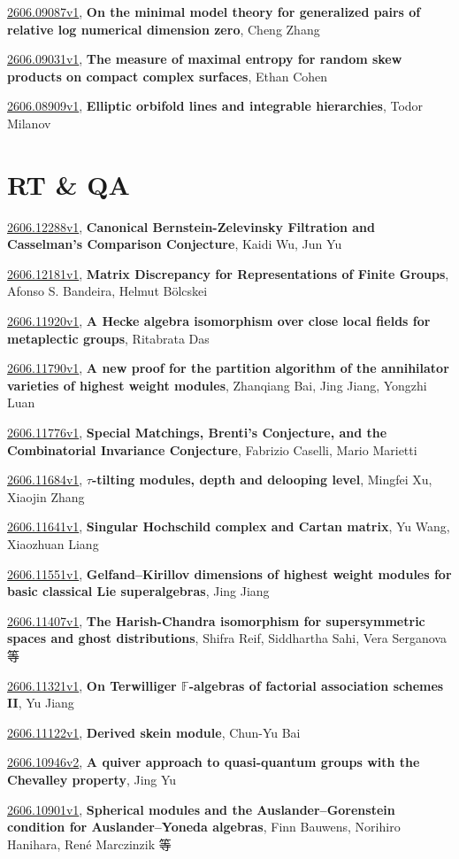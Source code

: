 \documentclass[9pt, a4paper]{article}
\theoremstyle{plain}
\theoremstyle{definition}
\theoremstyle{remark}
\newcommand{\arxiv}[3]{\href{https://arxiv.org/abs/#1}{#1}, \textbf{\textcolor{arxivblue}{#2}}, #3}
\begin{document}
\arxiv{2606.09087v1}{On the minimal model theory for generalized pairs of relative log numerical dimension zero}{Cheng Zhang}

\arxiv{2606.09031v1}{The measure of maximal entropy for random skew products on compact complex surfaces}{Ethan Cohen}

\arxiv{2606.08909v1}{Elliptic orbifold lines and integrable hierarchies}{Todor Milanov}


\section{RT \& QA}
\arxiv{2606.12288v1}{Canonical Bernstein-Zelevinsky Filtration and Casselman's Comparison Conjecture}{Kaidi Wu, Jun Yu}

\arxiv{2606.12181v1}{Matrix Discrepancy for Representations of Finite Groups}{Afonso S. Bandeira, Helmut Bölcskei}

\arxiv{2606.11920v1}{A Hecke algebra isomorphism over close local fields for metaplectic groups}{Ritabrata Das}

\arxiv{2606.11790v1}{A new proof for the partition algorithm of the annihilator varieties of highest weight modules}{Zhanqiang Bai, Jing Jiang, Yongzhi Luan}

\arxiv{2606.11776v1}{Special Matchings, Brenti's Conjecture, and the Combinatorial Invariance Conjecture}{Fabrizio Caselli, Mario Marietti}

\arxiv{2606.11684v1}{$τ$-tilting modules, depth and delooping level}{Mingfei Xu, Xiaojin Zhang}

\arxiv{2606.11641v1}{Singular Hochschild complex and Cartan matrix}{Yu Wang, Xiaozhuan Liang}

\arxiv{2606.11551v1}{Gelfand--Kirillov dimensions of highest weight modules for basic classical Lie superalgebras}{Jing Jiang}

\arxiv{2606.11407v1}{The Harish-Chandra isomorphism for supersymmetric spaces and ghost distributions}{Shifra Reif, Siddhartha Sahi, Vera Serganova 等}

\arxiv{2606.11321v1}{On Terwilliger $\mathbb{F}$-algebras of factorial association schemes II}{Yu Jiang}

\arxiv{2606.11122v1}{Derived skein module}{Chun-Yu Bai}

\arxiv{2606.10946v2}{A quiver approach to quasi-quantum groups with the Chevalley property}{Jing Yu}

\arxiv{2606.10901v1}{Spherical modules and the Auslander--Gorenstein condition for Auslander--Yoneda algebras}{Finn Bauwens, Norihiro Hanihara, René Marczinzik 等}
\end{document}
